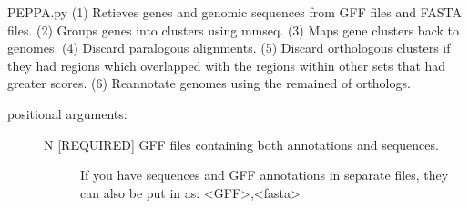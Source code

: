 \documentclass[letterpaper,10pt,english]{sphinxmanual}
\begin{document}
PEPPA.py
(1) Retieves genes and genomic sequences from GFF files and FASTA files.
(2) Groups genes into clusters using mmseq.
(3) Maps gene clusters back to genomes.
(4) Discard paralogous alignments.
(5) Discard orthologous clusters if they had regions which overlapped with the regions within other sets that had greater scores.
(6) Re\sphinxhyphen{}annotate genomes using the remained of orthologs.
\begin{description}
\item[{positional arguments:}] \leavevmode\begin{description}
\item[{N                     {[}REQUIRED{]} GFF files containing both annotations and sequences.}] \leavevmode
If you have sequences and GFF annotations in separate files,
they can also be put in as: \textless{}GFF\textgreater{},\textless{}fasta\textgreater{}

\end{description}


\end{description}
\end{document}

